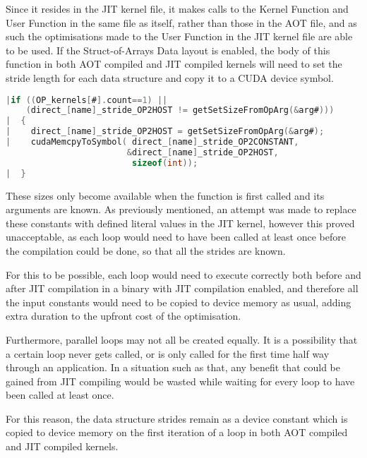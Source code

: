 \noindent Since it resides in the JIT kernel file, it makes calls to the Kernel Function and User Function in the same file as itself, rather than those in the AOT file, and as such the optimisations made to the User Function in the JIT kernel file are able to be used.
\clearpage
{}
If the Struct-of-Arrays Data layout is enabled, the body of this function in both AOT compiled and JIT compiled kernels will need to set the stride length for each data structure and copy it to a CUDA device symbol.
\begin{lstlisting}[linewidth = \textwidth, framesep=0pt,escapechar=:, language=C,backgroundcolor=\color{red!20}]
|if ((OP_kernels[#].count==1) ||
    (direct_[name]_stride_OP2HOST != getSetSizeFromOpArg(&arg#)))
|  {
|    direct_[name]_stride_OP2HOST = getSetSizeFromOpArg(&arg#);
|    cudaMemcpyToSymbol( direct_[name]_stride_OP2CONSTANT,
                        &direct_[name]_stride_OP2HOST,
                         sizeof(int));
|  }
\end{lstlisting}


\noindent These sizes only become available when the function is first called and its arguments are known. As previously mentioned, an attempt was made to replace these constants with defined literal values in the JIT kernel, however this proved unacceptable, as each loop would need to have been called at least once before the compilation could be done, so that all the strides are known.
\par
For this to be possible, each loop would need to execute correctly both before and after JIT compilation in a binary with JIT compilation enabled, and therefore all the input constants would need to be copied to device memory as usual, adding extra duration to the upfront cost of the optimisation.
\par
Furthermore, parallel loops may not all be created equally. It is a possibility that a certain loop never gets called, or is only called for the first time half way through an application. In a situation such as that, any benefit that could be gained from JIT compiling would be wasted while waiting for every loop to have been called at least once.
\par
For this reason, the data structure strides remain as a device constant which is copied to device memory on the first iteration of a loop in both AOT compiled and JIT compiled kernels.

\clearpage

